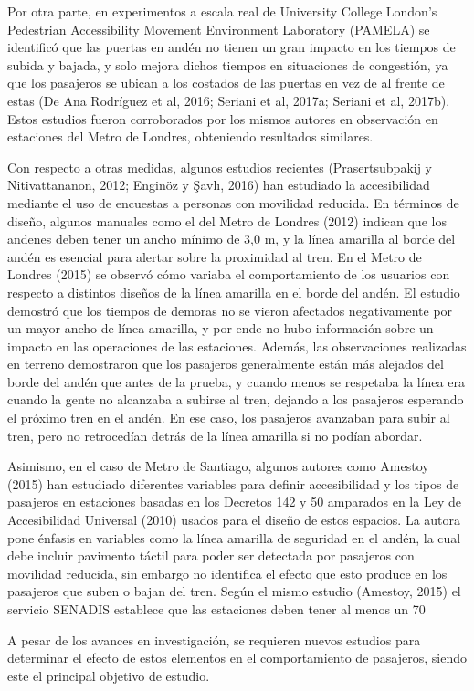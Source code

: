 Por otra parte, en experimentos a escala real de University College London’s Pedestrian Accessibility Movement Environment Laboratory (PAMELA) se identificó que las puertas en andén no tienen un gran impacto en los tiempos de subida y bajada, y solo mejora dichos tiempos en situaciones de congestión, ya que los pasajeros se ubican a los costados de las puertas en vez de al frente de estas (De Ana Rodríguez et al, 2016; Seriani et al, 2017a; Seriani et al, 2017b). Estos estudios fueron corroborados por los mismos autores en observación en estaciones del Metro de Londres, obteniendo resultados similares.

Con respecto a otras medidas, algunos estudios recientes (Prasertsubpakij y Nitivattananon, 2012; Enginöz y Şavlı, 2016) han estudiado la accesibilidad mediante el uso de encuestas a personas con movilidad reducida. En términos de diseño, algunos manuales como el del Metro de Londres (2012) indican que los andenes deben tener un ancho mínimo de 3,0 m, y la línea amarilla al borde del andén es esencial para alertar sobre la proximidad al tren. En el Metro de Londres (2015) se observó cómo variaba el comportamiento de los usuarios con respecto a distintos diseños de la línea amarilla en el borde del andén. El estudio demostró que los tiempos de demoras no se vieron afectados negativamente por un mayor ancho de línea amarilla, y por ende no hubo información sobre un impacto en las operaciones de las estaciones. Además, las observaciones realizadas en terreno demostraron que los pasajeros generalmente están más alejados del borde del andén que antes de la prueba, y cuando menos se respetaba la línea era cuando la gente no alcanzaba a subirse al tren, dejando a los pasajeros esperando el próximo tren en el andén. En ese caso, los pasajeros avanzaban para subir al tren, pero no retrocedían detrás de la línea amarilla si no podían abordar.

Asimismo, en el caso de Metro de Santiago, algunos autores como Amestoy (2015) han estudiado diferentes variables para definir accesibilidad y los tipos de pasajeros en estaciones basadas en los Decretos 142 y 50 amparados en la Ley de Accesibilidad Universal (2010) usados para el diseño de estos espacios. La autora pone énfasis en variables como la línea amarilla de seguridad en el andén, la cual debe incluir pavimento táctil para poder ser detectada por pasajeros con movilidad reducida, sin embargo no identifica el efecto que esto produce en los pasajeros que suben o bajan del tren. Según el mismo estudio (Amestoy, 2015) el servicio SENADIS establece que las estaciones deben tener al menos un 70%

A pesar de los avances en investigación, se requieren nuevos estudios para determinar el efecto de estos elementos en el comportamiento de pasajeros, siendo este el principal objetivo de estudio.

